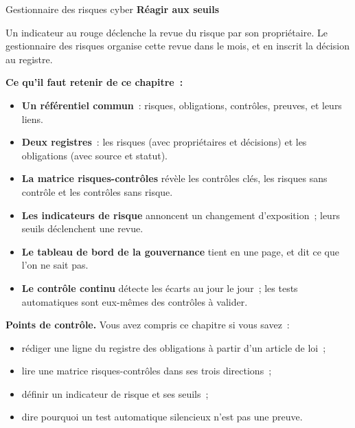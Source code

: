 \begin{boxmetier}{Gestionnaire des risques cyber}
\textbf{Réagir aux seuils}

Un indicateur au rouge déclenche la revue du risque par son propriétaire.
Le gestionnaire des risques organise cette revue dans le mois, et en
inscrit la décision au registre.
\end{boxmetier}

\separateur

\begin{boxresume}
\textbf{Ce qu'il faut retenir de ce chapitre~:}
\begin{itemize}
    \item \textbf{Un référentiel commun}~: risques, obligations, contrôles,
          preuves, et leurs liens.
    \item \textbf{Deux registres}~: les risques (avec propriétaires et
          décisions) et les obligations (avec source et statut).
    \item \textbf{La matrice risques-contrôles} révèle les contrôles clés,
          les risques sans contrôle et les contrôles sans risque.
    \item \textbf{Les indicateurs de risque} annoncent un changement
          d'exposition~; leurs seuils déclenchent une revue.
    \item \textbf{Le tableau de bord de la gouvernance} tient en une page,
          et dit ce que l'on ne sait pas.
    \item \textbf{Le contrôle continu} détecte les écarts au jour le jour~;
          les tests automatiques sont eux-mêmes des contrôles à valider.
\end{itemize}
\end{boxresume}

\begin{boxinfo}
\textbf{Points de contrôle.} Vous avez compris ce chapitre si vous savez~:
\begin{itemize}
    \item rédiger une ligne du registre des obligations à partir d'un
          article de loi~;
    \item lire une matrice risques-contrôles dans ses trois directions~;
    \item définir un indicateur de risque et ses seuils~;
    \item dire pourquoi un test automatique silencieux n'est pas une
          preuve.
\end{itemize}
\end{boxinfo}

